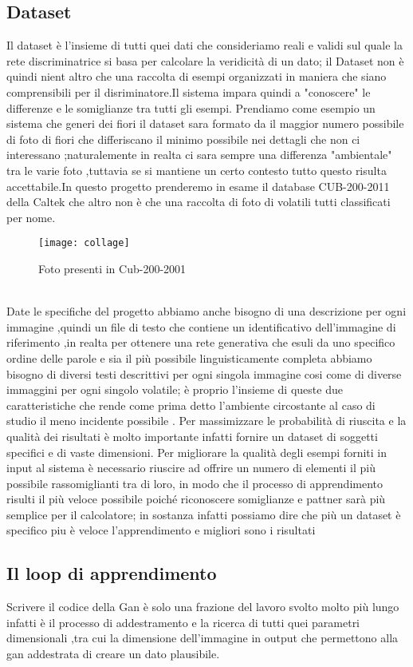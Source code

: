 \subsection{Dataset}
Il dataset è l'insieme di tutti quei dati che consideriamo reali e validi  sul quale la rete discriminatrice si basa per calcolare la veridicità di un dato;
il Dataset non è quindi nient altro che una raccolta di esempi organizzati in maniera che siano comprensibili per il disriminatore.Il sistema impara quindi a "conoscere" le differenze e le somiglianze tra tutti gli esempi.
Prendiamo come esempio un sistema che generi dei fiori il dataset sara formato da il maggior numero possibile di foto di  fiori che differiscano il minimo possibile nei dettagli che non ci interessano ;naturalemente in realta ci sara sempre una differenza "ambientale" tra le varie foto ,tuttavia se si mantiene un certo contesto tutto questo risulta accettabile.In questo progetto prenderemo in esame il database CUB-200-2011 della Caltek che altro non è che una raccolta di foto di volatili tutti classificati per nome.
\begin{figure}[h]
\caption{Foto presenti in Cub-200-2001}
\centering
\texttt{[image: collage]} 
\end{figure}
\\
Date le specifiche  del progetto abbiamo anche bisogno di una descrizione per ogni immagine ,quindi un file di testo che contiene un identificativo dell'immagine di riferimento ,in realta per ottenere una rete generativa che esuli da uno specifico ordine delle parole e sia il più possibile linguisticamente completa abbiamo bisogno di diversi testi descrittivi per ogni singola immagine  cosi come di diverse immaggini per ogni singolo volatile; è proprio l'insieme di queste due caratteristiche che rende come prima detto l'ambiente circostante al caso di studio il meno incidente possibile .
Per massimizzare le probabilità di riuscita e la qualità dei risultati è molto importante infatti  fornire un dataset di soggetti specifici  e di vaste dimensioni. Per migliorare la qualità degli esempi forniti in input al sistema è necessario riuscire ad offrire un numero di elementi il più possibile rassomiglianti tra di loro, in modo che il processo di apprendimento risulti il più veloce possibile poiché riconoscere somiglianze e pattner sarà più semplice per il calcolatore; in sostanza infatti possiamo dire che più un dataset è specifico piu è veloce l'apprendimento e migliori sono i risultati
\subsection{Il loop di apprendimento }
Scrivere il codice della Gan è solo una frazione del lavoro svolto  molto più lungo infatti è il processo di addestramento e la ricerca di tutti quei parametri dimensionali ,tra cui la dimensione dell'immagine in output che permettono alla gan addestrata di creare un dato plausibile.




